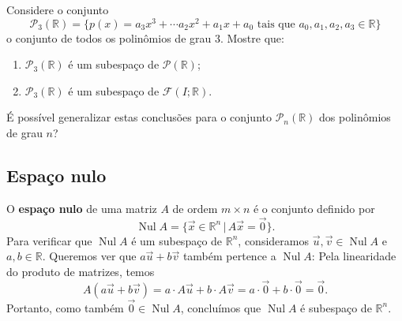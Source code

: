 \begin{exer}
	Considere o conjunto
	\begin{equation}
	\mathcal{P}_3 (\mathbb{R}) = \{ p(x) = a_3 x^3 + \cdots a_2 x^2 + a_1 x + a_0 \text{ tais que } a_0, a_1, a_2, a_3 \in \mathbb{R} \}
	\end{equation} o conjunto de todos os polinômios de grau 3. Mostre que:
	\begin{enumerate}
		\item $\mathcal{P}_3 (\mathbb{R})$ é um subespaço de $\mathcal{P} (\mathbb{R})$;
		\item $\mathcal{P}_3 (\mathbb{R})$ é um subespaço de $\mathcal{F} (I;\mathbb{R})$.
	\end{enumerate} É possível generalizar estas conclusões para o conjunto $\mathcal{P}_n (\mathbb{R})$ dos polinômios de grau $n$?
\end{exer}


\subsection{Espaço nulo}

O \textbf{espaço nulo} de uma matriz $A$ de ordem $m \times n$ é o conjunto definido por
\begin{equation}
\operatorname{Nul} A = \big\{ \vec{x} \in \mathbb{R}^n \, | \, A\vec{x} = \vec{0}  \big\}.
\end{equation} Para verificar que $\operatorname{Nul} A$ é um subespaço de $\mathbb{R}^n$, consideramos $\vec{u}, \vec{v} \in \operatorname{Nul} A$ e $a,b \in \mathbb{R}$. Queremos ver que $a\vec{u} + b\vec{v}$ também pertence a $\operatorname{Nul} A$: Pela linearidade do produto de matrizes, temos
\begin{equation}
A (a\vec{u} + b\vec{v}) = a \cdot A\vec{u} + b\cdot A\vec{v} = a\cdot \vec{0} + b \cdot \vec{0} = \vec{0}.
\end{equation} Portanto, como também $\vec{0} \in \operatorname{Nul} A$, concluímos que $\operatorname{Nul} A$ é subespaço de $\mathbb{R}^n$.

